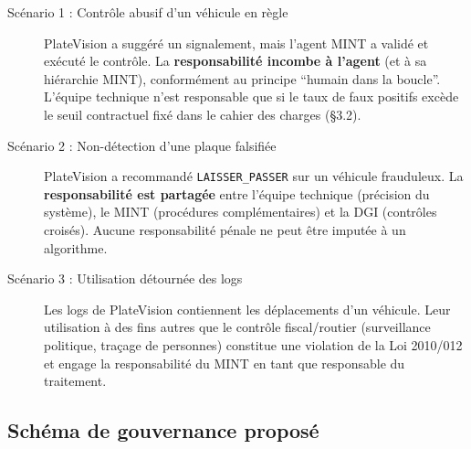 \begin{description}
  \item[Sc\'{e}nario 1 : Contr\^{o}le abusif d'un v\'{e}hicule en r\`{e}gle]
    PlateVision a sugg\'{e}r\'{e} un signalement, mais l'agent MINT a valid\'{e}
    et ex\'{e}cut\'{e} le contr\^{o}le. La \textbf{responsabilit\'{e} incombe
    \`{a} l'agent} (et \`{a} sa hi\'{e}rarchie MINT), conform\'{e}ment au
    principe ``humain dans la boucle''. L'\'{e}quipe technique n'est
    responsable que si le taux de faux positifs exc\`{e}de le seuil
    contractuel fix\'{e} dans le cahier des charges (§3.2).

  \item[Sc\'{e}nario 2 : Non-d\'{e}tection d'une plaque falsifi\'{e}e]
    PlateVision a recommand\'{e} \texttt{LAISSER\_PASSER} sur un v\'{e}hicule
    frauduleux. La \textbf{responsabilit\'{e} est partag\'{e}e} entre l'\'{e}quipe
    technique (pr\'{e}cision du syst\`{e}me), le MINT (proc\'{e}dures compl\'{e}mentaires)
    et la DGI (contr\^{o}les crois\'{e}s). Aucune responsabilit\'{e} p\'{e}nale
    ne peut \^{e}tre imput\'{e}e \`{a} un algorithme.

  \item[Sc\'{e}nario 3 : Utilisation d\'{e}tourn\'{e}e des logs]
    Les logs de PlateVision contiennent les d\'{e}placements d'un v\'{e}hicule.
    Leur utilisation \`{a} des fins autres que le contr\^{o}le fiscal/routier
    (surveillance politique, traçage de personnes) constitue une violation
    de la Loi 2010/012 et engage la responsabilit\'{e} du MINT en tant que
    responsable du traitement.
\end{description}

\subsection{Sch\'{e}ma de gouvernance propos\'{e}}
\label{sec:d:schema}

